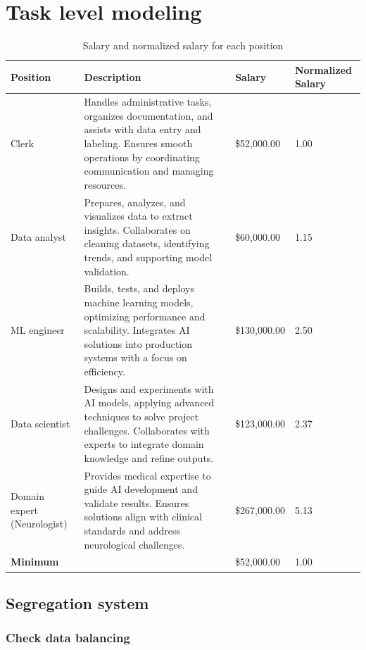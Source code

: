 \section{Task level modeling}

\begin{table}[H]
\centering
\begin{tabularx}{\textwidth}{|p{2.5cm}|X|l|m{2cm}|}
\hline
\textbf{Position} & \textbf{Description} & \textbf{Salary} & \textbf{Normalized Salary} \\
\hline
Clerk & Handles administrative tasks, organizes documentation, and assists with data entry and labeling.
Ensures smooth operations by coordinating communication and managing resources. & \$52,000.00 & 1.00 \\
\hline
Data analyst & Prepares, analyzes, and visualizes data to extract insights. 
Collaborates on cleaning datasets, identifying trends, and supporting model validation. & \$60,000.00 & 1.15 \\
\hline
ML engineer & Builds, tests, and deploys machine learning models, optimizing performance and scalability. 
Integrates AI solutions into production systems with a focus on efficiency. & \$130,000.00 & 2.50 \\
\hline
Data scientist & Designs and experiments with AI models, applying advanced techniques to solve project challenges. 
Collaborates with experts to integrate domain knowledge and refine outputs. & \$123,000.00 & 2.37 \\
\hline
Domain expert (Neurologist) & Provides medical expertise to guide AI development and validate results. 
Ensures solutions align with clinical standards and address neurological challenges. & \$267,000.00 & 5.13 \\
\hline
\multicolumn{2}{|l|}{\textbf{Minimum}} & \$52,000.00 & 1.00 \\
\hline
\end{tabularx}
\caption{Salary and normalized salary for each position}
\label{table:salary}
\end{table}

\subsection{Segregation system}

\subsubsection{Check data balancing}

